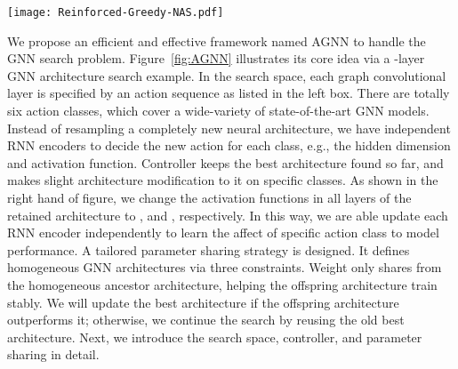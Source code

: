 \documentclass[sigconf]{acmart}
\begin{document}
\begin{figure*}
    \centering
    \texttt{[image: Reinforced-Greedy-NAS.pdf]}\\
    \vspace{-10pt}
    \caption{Illustration of AGNN with -layer GNN search. Controller takes the best architecture found so far as input, and removes one of the six classes in turns to generate six subarchitectures. Their strings are fed to RNN encoders to determinate the best alternative action for the missing class. We select the new best architecture from all completed subarchitectures, based the accompanied decision entropy.
Herein action guider selects class list . The retained architecture is modified via replacing activation functions with , , and , in all  graph convolutional layers, respectively.}
    \label{fig:AGNN}
\end{figure*}

We propose an efficient and effective framework named AGNN to handle the GNN search problem. Figure~\ref{fig:AGNN} illustrates its core idea via a -layer GNN architecture search example.
In the search space, each graph convolutional layer is specified by an action sequence as listed in the left box. There are totally six action classes, which cover a wide-variety of state-of-the-art GNN models.
Instead of resampling a completely new neural architecture, we have independent RNN encoders to decide the new action for each class, e.g., the hidden dimension and activation function. Controller keeps the best architecture found so far, and makes slight architecture modification to it on specific classes. As shown in the right hand of figure, we change the activation functions in all  layers of the retained architecture to ,  and , respectively. In this way, we are able update each RNN encoder independently to learn the affect of specific action class to model performance. 
A tailored parameter sharing strategy is designed. It defines homogeneous GNN architectures via three constraints. Weight only shares from the homogeneous ancestor architecture, helping the offspring architecture train stably. We will update the best architecture if the offspring architecture outperforms it; otherwise, we continue the search by reusing the old best architecture. Next, we introduce the search space, controller, and parameter sharing in detail.
\end{document}
